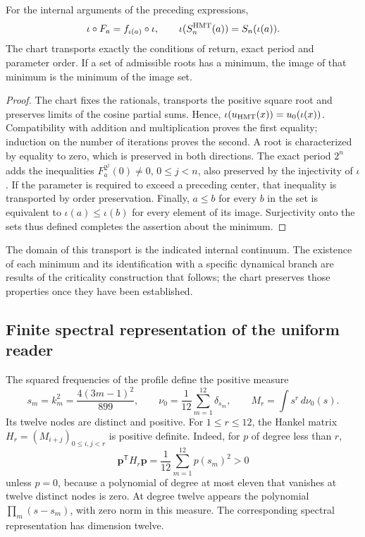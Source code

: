 \begin{proposition}
\label{hmtfg:conjugacion-selector}
For the internal arguments of the preceding expressions,
\[
 \iota\circ F_a=f_{\iota(a)}\circ\iota,\qquad
 \iota(S_n^{\rm HMT}(a))=S_n(\iota(a)).
\]
The chart transports exactly the conditions of return, exact period and parameter order. If a set of admissible roots has a minimum, the image of that minimum is the minimum of the image set.
\end{proposition}
\begin{proof}
The chart fixes the rationals, transports the positive square root and preserves limits of the cosine partial sums. Hence, \(\iota(u_{\rm HMT}(x))=u_0(\iota(x))\). Compatibility with addition and multiplication proves the first equality; induction on the number of iterations proves the second. A root is characterized by equality to zero, which is preserved in both directions. The exact period \(2^n\) adds the inequalities \(F_a^{2^j}(0)\ne0\), \(0\le j<n\), also preserved by the injectivity of \(\iota\). If the parameter is required to exceed a preceding center, that inequality is transported by order preservation. Finally, \(a\le b\) for every \(b\) in the set is equivalent to \(\iota(a)\le\iota(b)\) for every element of its image. Surjectivity onto the sets thus defined completes the assertion about the minimum.
\end{proof}

The domain of this transport is the indicated internal continuum. The existence of each minimum and its identification with a specific dynamical branch are results of the criticality construction that follows; the chart preserves those properties once they have been established.

\subsection{Finite spectral representation of the uniform reader}
\label{hmtfg:jacobi-finito}

The squared frequencies of the profile define the positive measure
\[
 s_m=k_m^2=\frac{4(3m-1)^2}{899},\qquad
 \nu_0=\frac1{12}\sum_{m=1}^{12}\delta_{s_m},\qquad
 M_r=\int s^r\,d\nu_0(s).
\]
Its twelve nodes are distinct and positive. For \(1\le r\le12\), the Hankel matrix \(H_r=(M_{i+j})_{0\le i,j<r}\) is positive definite. Indeed, for \(p\) of degree less than \(r\),
\[
 \mathbf p^{\mathsf T}H_r\mathbf p
   =\frac1{12}\sum_{m=1}^{12}p(s_m)^2>0
\]
unless \(p=0\), because a polynomial of degree at most eleven that vanishes at twelve distinct nodes is zero. At degree twelve appears the polynomial \(\prod_m(s-s_m)\), with zero norm in this measure. The corresponding spectral representation has dimension twelve.


